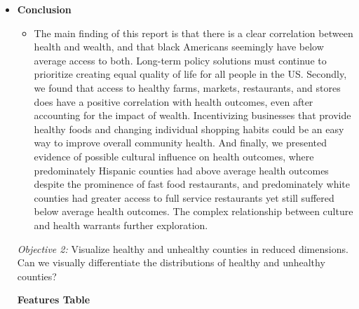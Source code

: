 \documentclass{article}
\begin{document}
\begin{itemize}[leftmargin=0pt]
\item[] \textbf{Conclusion}
\begin{itemize}
    \item[] The main finding of this report is that there is a clear correlation between health and wealth, and that black Americans seemingly have below average access to both. Long-term policy solutions must continue to prioritize creating equal quality of life for all people in the US. Secondly, we found that access to healthy farms, markets, restaurants, and stores does have a positive correlation with health outcomes, even after accounting for the impact of wealth. Incentivizing businesses that provide healthy foods and changing individual shopping habits could be an easy way to improve overall community health. And finally, we presented evidence of possible cultural influence on health outcomes, where predominately Hispanic counties had above average health outcomes despite the prominence of fast food restaurants, and predominately white counties had greater access to full service restaurants yet still suffered below average health outcomes. The complex relationship between culture and health warrants further exploration.
\end{itemize}


\textit{Objective 2:} Visualize healthy and unhealthy counties in reduced dimensions. Can we visually differentiate the distributions of healthy and unhealthy counties?

\textbf{Features Table}


\end{itemize}
\end{document}
